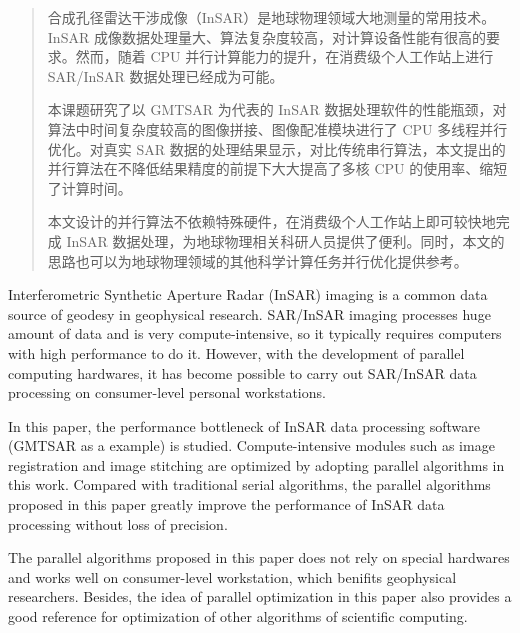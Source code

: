 ﻿\begin{abstract}

合成孔径雷达干涉成像（InSAR）是地球物理领域大地测量的常用技术。InSAR 成像数据处理量大、算法复杂度较高，对计算设备性能有很高的要求。然而，随着 CPU 并行计算能力的提升，在消费级个人工作站上进行 SAR/InSAR 数据处理已经成为可能。

本课题研究了以 GMTSAR 为代表的 InSAR 数据处理软件的性能瓶颈，对算法中时间复杂度较高的图像拼接、图像配准模块进行了 CPU 多线程并行优化。对真实 SAR 数据的处理结果显示，对比传统串行算法，本文提出的并行算法在不降低结果精度的前提下大大提高了多核 CPU 的使用率、缩短了计算时间。

本文设计的并行算法不依赖特殊硬件，在消费级个人工作站上即可较快地完成 InSAR 数据处理，为地球物理相关科研人员提供了便利。同时，本文的思路也可以为地球物理领域的其他科学计算任务并行优化提供参考。
    
\end{abstract}

\begin{enabstract}
Interferometric Synthetic Aperture Radar (InSAR) imaging is a common data source of geodesy in geophysical research. SAR/InSAR imaging processes huge amount of data and is very compute-intensive, so it typically requires computers with high performance to do it. However, with the development of parallel computing hardwares, it has become possible to carry out SAR/InSAR data processing on consumer-level personal workstations.

In this paper, the performance bottleneck of InSAR data processing software (GMTSAR as a example) is studied. Compute-intensive modules such as image registration and image stitching are optimized by adopting parallel algorithms in this work. Compared with traditional serial algorithms, the parallel algorithms proposed in this paper greatly improve the performance of InSAR data processing without loss of precision.

The parallel algorithms proposed in this paper does not rely on special hardwares and works well on consumer-level workstation, which benifits geophysical researchers. Besides, the idea of parallel optimization in this paper also provides a good reference for optimization of other algorithms of scientific computing.

\end{enabstract}
